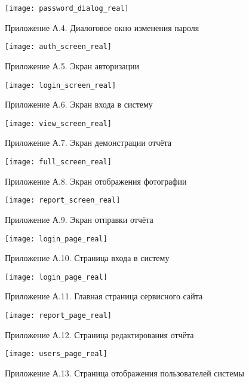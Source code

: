 \begin{figure}[!htbp]
	\texttt{[image: password\_dialog\_real]}
	\centering
	\caption*{Приложение А.4. Диалоговое окно изменения пароля}
\end{figure}

\begin{figure}[!htbp]
	\texttt{[image: auth\_screen\_real]}
	\centering
	\caption*{Приложение А.5. Экран авторизации}
\end{figure}

\begin{figure}[!htbp]
	\texttt{[image: login\_screen\_real]}
	\centering
	\caption*{Приложение А.6. Экран входа в систему}
\end{figure}

\begin{figure}[!htbp]
	\texttt{[image: view\_screen\_real]}
	\centering
	\caption*{Приложение А.7. Экран демонстрации отчёта}
\end{figure}

\begin{figure}[!htbp]
	\texttt{[image: full\_screen\_real]}
	\centering
	\caption*{Приложение А.8. Экран отображения фотографии}
\end{figure}

\begin{figure}[!htbp]
	\texttt{[image: report\_screen\_real]}
	\centering
	\caption*{Приложение А.9. Экран отправки отчёта}
\end{figure}

\begin{figure}[!htbp]
	\texttt{[image: login\_page\_real]}
	\centering
	\caption*{Приложение А.10. Страница входа в систему}
\end{figure}

\begin{figure}[!htbp]
	\texttt{[image: login\_page\_real]}
	\centering
	\caption*{Приложение А.11. Главная страница сервисного сайта}
\end{figure}

\begin{figure}[!htbp]
	\texttt{[image: report\_page\_real]}
	\centering
	\caption*{Приложение А.12. Страница редактирования отчёта}
\end{figure}

\begin{figure}[!htbp]
	\texttt{[image: users\_page\_real]}
	\centering
	\caption*{Приложение А.13. Страница отображения пользователей системы}
\end{figure}


